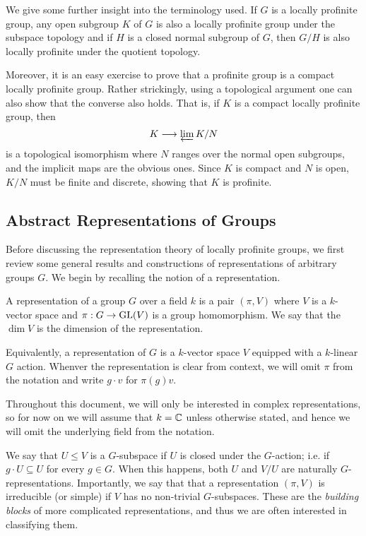 We give some further insight into the terminology used. If $G$ is a locally profinite group, any open subgroup $K$ of $G$ is also a locally profinite group under the subspace topology and if $H$ is a closed normal subgroup of $G$, then $G/H$ is also locally profinite under the quotient topology. 

Moreover, it is an easy exercise to prove that a profinite group is a compact locally profinite group. Rather strickingly, using a topological argument one can also show that the converse also holds. That is, if $K$ is a compact locally profinite group, then
$$K\longrightarrow\varprojlim K/N$$
is a topological isomorphism where $N$ ranges over the normal open subgroups, and the implicit maps are the obvious ones. Since $K$ is compact and $N$ is open, $K/N$ must be finite and discrete, showing that $K$ is profinite.

\subsection{Abstract Representations of Groups} \label{Abstract_Reps}
Before discussing the representation theory of locally profinite groups, we first review some general results and constructions of representations of arbitrary groups $G$. We begin by recalling the notion of a representation.

\begin{defn}
    A representation of a group $G$ over a field $k$ is a pair $(\pi,V)$ where $V$ is a $k$-vector space and $\pi:G\rightarrow\mathrm{GL}(V)$ is a group homomorphism. We say that the $\dim V$ is the dimension of the representation.
\end{defn}

Equivalently, a representation of $G$ is a $k$-vector space $V$ equipped with a $k$-linear $G$ action. Whenver the representation is clear from context, we will omit $\pi$ from the notation and write $g\cdot v$ for $\pi(g)v$. 

Throughout this document, we will only be interested in complex representations, so for now on we will assume that $k=\mathbb{C}$ unless otherwise stated, and hence we will omit the underlying field from the notation.

We say that $U\leq V$ is a $G$-subspace if $U$ is closed under the $G$-action; i.e. if $g\cdot U\subseteq U$ for every $g\in G$. When this happens, both $U$ and $V/U$ are naturally $G$-representations. Importantly, we say that that a representation $(\pi,V)$ is irreducible (or simple) if $V$ has no non-trivial $G$-subspaces. These are the \textit{building blocks} of more complicated representations, and thus we are often interested in classifying them.


